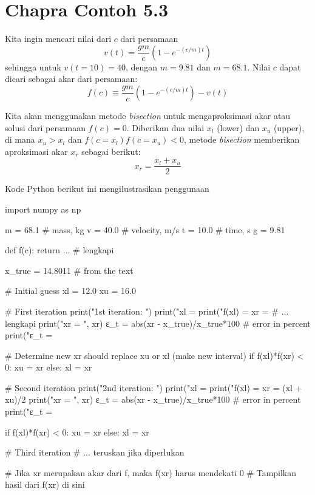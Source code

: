 \section{Chapra Contoh 5.3}

Kita ingin mencari nilai dari $c$ dari persamaan
\begin{equation*}
v(t) = \frac{gm}{c}(1 - e^{-(c/m)t})
\end{equation*}
sehingga untuk $v(t=10) = 40$, dengan $m=9.81$ dan $m=68.1$.
Nilai $c$ dapat dicari sebagai akar dari persamaan:
\begin{equation*}
f(c) \equiv \frac{gm}{c}(1 - e^{-(c/m)t}) - v(t)
\end{equation*}

Kita akan menggunakan metode \textit{bisection} untuk mengaproksimasi akar atau solusi dari
persamaan $f(c) = 0$. Diberikan dua nilai $x_{l}$ (lower) dan $x_{u}$ (upper), di mana
$x_{u} > x_{l}$ dan $f(c=x_{l})f(c=x_{u}) < 0$, metode \textit{bisection} memberikan
aproksimasi akar $x_{r}$ sebagai berikut:
\begin{equation}
x_{r} = \frac{x_{l} + x_{u}}{2}
\end{equation}

Kode Python berikut ini mengilustrasikan penggunaan 
\begin{pythoncode}
import numpy as np

m = 68.1 # mass, kg
v = 40.0 # velocity, m/s
t = 10.0 # time, s
g = 9.81
    
def f(c):
  return ... # lengkapi
    
x_true = 14.8011 # from the text
    
# Initial guess
xl = 12.0
xu = 16.0
    
# First iteration
print("\n1st iteration: ")
print("xl = %
print("f(xl) = %
xr = # ... lengkapi
print("xr = ", xr)
ε_t = abs(xr - x_true)/x_true*100 # error in percent
print("ε_t = %

# Determine new xr should replace xu or xl (make new interval)
if f(xl)*f(xr) < 0:
  xu = xr
else:
  xl = xr
    
# Second iteration
print("\n2nd iteration: ")
print("xl = %
print("f(xl) = %
xr = (xl + xu)/2
print("xr = ", xr)
ε_t = abs(xr - x_true)/x_true*100 # error in percent
print("ε_t = %

if f(xl)*f(xr) < 0:
  xu = xr
else:
  xl = xr
    
# Third iteration
# ... teruskan jika diperlukan

# Jika xr merupakan akar dari f, maka f(xr) harus mendekati 0
# Tampilkan hasil dari f(xr) di sini
\end{pythoncode}

